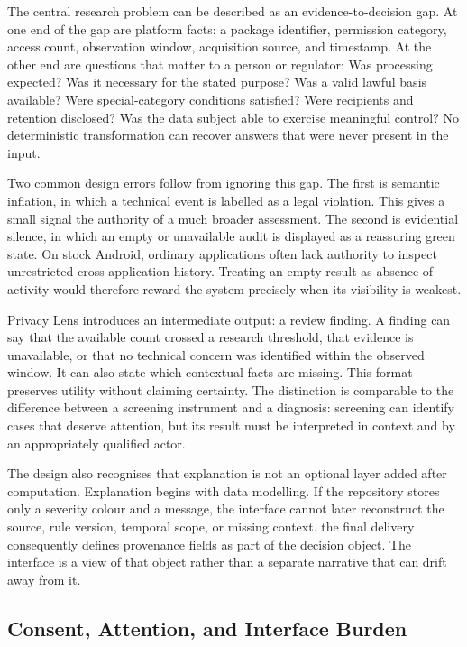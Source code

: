 The central research problem can be described as an evidence-to-decision gap. At one end of the gap are platform facts: a package identifier, permission category, access count, observation window, acquisition source, and timestamp. At the other end are questions that matter to a person or regulator: Was processing expected? Was it necessary for the stated purpose? Was a valid lawful basis available? Were special-category conditions satisfied? Were recipients and retention disclosed? Was the data subject able to exercise meaningful control? No deterministic transformation can recover answers that were never present in the input.

Two common design errors follow from ignoring this gap. The first is semantic inflation, in which a technical event is labelled as a legal violation. This gives a small signal the authority of a much broader assessment. The second is evidential silence, in which an empty or unavailable audit is displayed as a reassuring green state. On stock Android, ordinary applications often lack authority to inspect unrestricted cross-application history. Treating an empty result as absence of activity would therefore reward the system precisely when its visibility is weakest.

Privacy Lens introduces an intermediate output: a review finding. A finding can say that the available count crossed a research threshold, that evidence is unavailable, or that no technical concern was identified within the observed window. It can also state which contextual facts are missing. This format preserves utility without claiming certainty. The distinction is comparable to the difference between a screening instrument and a diagnosis: screening can identify cases that deserve attention, but its result must be interpreted in context and by an appropriately qualified actor.

The design also recognises that explanation is not an optional layer added after computation. Explanation begins with data modelling. If the repository stores only a severity colour and a message, the interface cannot later reconstruct the source, rule version, temporal scope, or missing context. the final delivery consequently defines provenance fields as part of the decision object. The interface is a view of that object rather than a separate narrative that can drift away from it.

\subsection{Consent, Attention, and Interface Burden}

